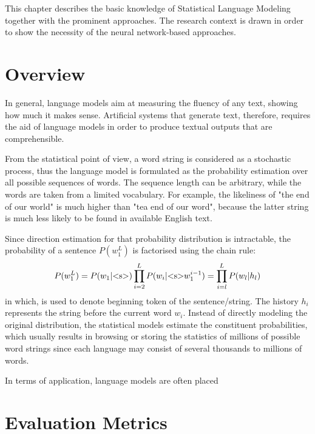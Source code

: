 This chapter describes the basic knowledge of Statistical Language Modeling together with the prominent approaches. The research context is 
drawn in order to show the necessity of the neural network-based approaches. 

\section{Overview}
In general, language models aim at measuring the fluency of any text, showing how much it makes sense. Artificial systems that generate text, therefore, requires
the aid of language models in order to produce textual outputs that are comprehensible. 

From the statistical point of view, a word string is considered as a stochastic process, thus the language model is formulated as the probability estimation over all 
possible sequences of words. The sequence length can be arbitrary, while the words are taken from a limited vocabulary. For example, the likeliness of "the end of our world" is much higher than "tea end of our word", because the latter string is much less likely to be found in available English text. 

Since direction estimation for that probability distribution is intractable, the probability of a sentence $P(w_1^L)$ is factorised using the chain rule:
\begin{equation}
\label{eq:lm1}
P(w_1^L) = P(w_1 | \text{\textless s\textgreater}) \prod_{i=2}^L P(w_i | \text{\textless s\textgreater} w_1^{i-1})\\
		 = \prod_{i=l}^L P(w_l | h_l)
\end{equation}
in which,  is used to denote beginning token of the sentence/string. The history $h_i$ represents the string before the current word $w_i$. Instead of directly modeling the original distribution, the statistical models estimate the constituent probabilities, which usually results in browsing or storing the statistics of millions of
possible word strings since each language may consist of several thousands to millions of words. 

In terms of application, language models are often placed 


\section{Evaluation Metrics}

